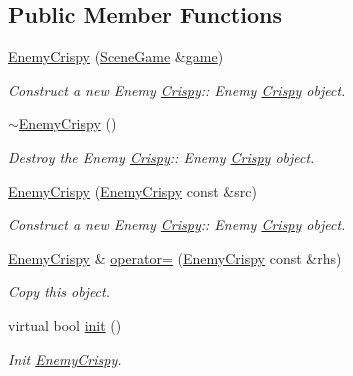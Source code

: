 \subsection*{Public Member Functions}
\begin{DoxyCompactItemize}
\item 
\hyperlink{class_enemy_crispy_a276b17f05168f7300b6f28472448d422}{Enemy\+Crispy} (\hyperlink{class_scene_game}{Scene\+Game} \&\hyperlink{class_a_entity_aa2c05db944a8b7487eb8470dd20211ab}{game})
\begin{DoxyCompactList}\small\item\em Construct a new Enemy \hyperlink{class_crispy}{Crispy}\+:\+: Enemy \hyperlink{class_crispy}{Crispy} object. \end{DoxyCompactList}\item 
\mbox{\label{class_enemy_crispy_a5a864f054ef724182b37e489e2ac2324}} 
\hyperlink{class_enemy_crispy_a5a864f054ef724182b37e489e2ac2324}{$\sim$\+Enemy\+Crispy} ()
\begin{DoxyCompactList}\small\item\em Destroy the Enemy \hyperlink{class_crispy}{Crispy}\+:\+: Enemy \hyperlink{class_crispy}{Crispy} object. \end{DoxyCompactList}\item 
\hyperlink{class_enemy_crispy_abd24cf23c15fab4323eceabf2b805898}{Enemy\+Crispy} (\hyperlink{class_enemy_crispy}{Enemy\+Crispy} const \&src)
\begin{DoxyCompactList}\small\item\em Construct a new Enemy \hyperlink{class_crispy}{Crispy}\+:\+: Enemy \hyperlink{class_crispy}{Crispy} object. \end{DoxyCompactList}\item 
\hyperlink{class_enemy_crispy}{Enemy\+Crispy} \& \hyperlink{class_enemy_crispy_ab91c7b22982054521158b56b4bea1d4c}{operator=} (\hyperlink{class_enemy_crispy}{Enemy\+Crispy} const \&rhs)
\begin{DoxyCompactList}\small\item\em Copy this object. \end{DoxyCompactList}\item 
virtual bool \hyperlink{class_enemy_crispy_a87a926e52fd94e7307baaad8cb1b4977}{init} ()
\begin{DoxyCompactList}\small\item\em Init \hyperlink{class_enemy_crispy}{Enemy\+Crispy}. \end{DoxyCompactList}\item 

\end{DoxyCompactItemize}
